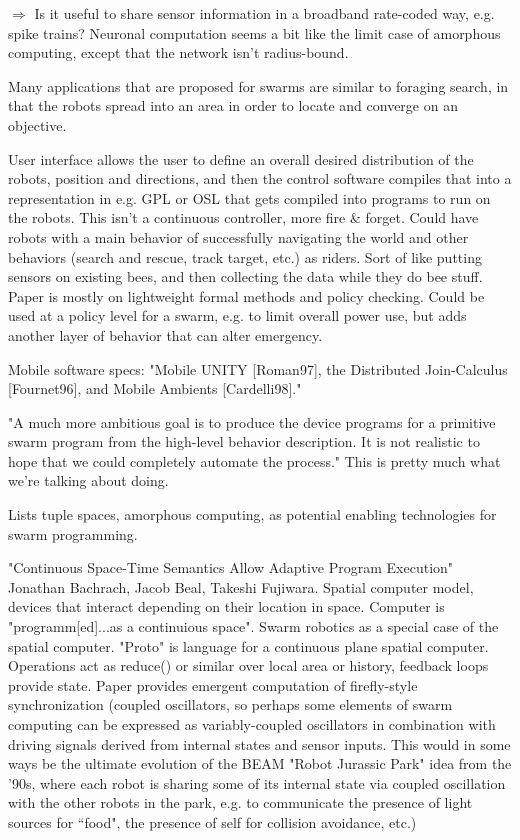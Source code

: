 \documentclass[]{article}
\begin{document}
$\Rightarrow$ Is it useful to share sensor information in a broadband rate-coded way, e.g. spike trains? Neuronal computation seems a bit like the limit case of amorphous computing, except that the network isn't radius-bound. 

Many applications that are proposed for swarms are similar to foraging search, in that the robots spread into an area in order to locate and converge on an objective. 

User interface allows the user to define an overall desired distribution of the robots, position and directions, and then the control software compiles that into a representation in e.g. GPL or OSL that gets compiled into programs to run on the robots. This isn't a continuous controller, more fire \& forget. Could have robots with a main behavior of successfully navigating the world and other behaviors (search and rescue, track target, etc.) as riders. Sort of like putting sensors on existing bees, and then collecting the data while they do bee stuff. Paper is mostly on lightweight formal methods and policy checking. Could be used at a policy level for a swarm, e.g. to limit overall power use, but adds another layer of behavior that can alter emergency. 

Mobile software specs: "Mobile UNITY [Roman97], the Distributed Join-Calculus [Fournet96], and Mobile Ambients [Cardelli98]."

"A much more ambitious goal is to produce the device programs for a primitive swarm program from the high-level behavior description. It is not realistic to hope that we could completely automate the process." This is pretty much what we're talking about doing. 

Lists tuple spaces, amorphous computing, as potential enabling technologies for swarm programming. 

"Continuous Space-Time Semantics Allow Adaptive Program Execution" \cite{bachrach2007continuous} Jonathan Bachrach, Jacob Beal, Takeshi Fujiwara. Spatial computer model, devices that interact depending on their location in space. Computer is "programm[ed]...as a continuious space". Swarm robotics as a special case of the spatial computer. "Proto" is language for a continuous plane spatial computer. Operations act as reduce() or similar over local area or history, feedback loops provide state. Paper provides emergent computation of firefly-style synchronization (coupled oscillators, so perhaps some elements of swarm computing can be expressed as variably-coupled oscillators in combination with driving signals derived from internal states and sensor inputs. This would in some ways be the ultimate evolution of the BEAM "Robot Jurassic Park" idea from the '90s, where each robot is sharing some of its internal state via coupled oscillation with the other robots in the park, e.g. to communicate the presence of light sources for ``food", the presence of self for collision avoidance, etc.)
\end{document}
